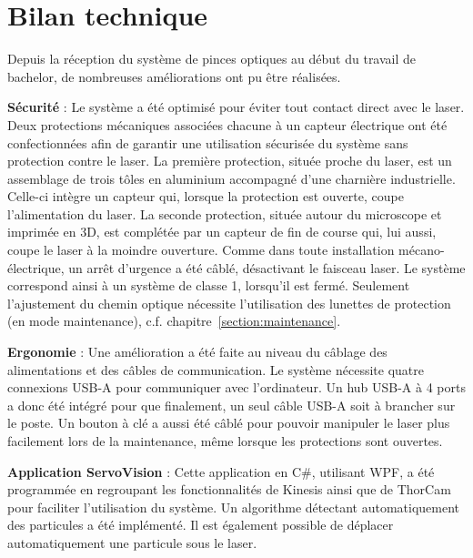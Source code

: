 

\section*{Bilan technique}
Depuis la réception du système de pinces optiques au début du travail de bachelor, de nombreuses améliorations ont pu être réalisées.

\textbf{Sécurité} :
Le système a été optimisé pour éviter tout contact direct avec le laser. Deux protections mécaniques associées chacune à un capteur électrique ont été confectionnées afin de garantir une utilisation sécurisée du système sans protection contre le laser. La première protection, située proche du laser, est un assemblage de trois tôles en aluminium accompagné d'une charnière industrielle. Celle-ci intègre un capteur qui, lorsque la protection est ouverte, coupe l'alimentation du laser. La seconde protection, située autour du microscope et imprimée en 3D, est complétée par un capteur de fin de course qui, lui aussi, coupe le laser à la moindre ouverture. Comme dans toute installation mécano-électrique, un arrêt d'urgence a été câblé, désactivant le faisceau laser. Le système correspond ainsi à un système de classe 1, lorsqu'il est fermé. Seulement l'ajustement du chemin optique nécessite l'utilisation des lunettes de protection (en mode maintenance), c.f. chapitre~\ref{section:maintenance}.

\textbf{Ergonomie} :
Une amélioration a été faite au niveau du câblage des alimentations et des câbles de communication. Le système nécessite quatre connexions USB-A pour communiquer avec l'ordinateur. Un hub USB-A à 4 ports a donc été intégré pour que finalement, un seul câble USB-A soit à brancher sur le poste. Un bouton à clé a aussi été câblé pour pouvoir manipuler le laser plus facilement lors de la maintenance, même lorsque les protections sont ouvertes.

\textbf{Application ServoVision} :
Cette application en C\#, utilisant WPF, a été programmée en regroupant les fonctionnalités de Kinesis ainsi que de ThorCam pour faciliter l'utilisation du système. Un algorithme détectant automatiquement des particules a été implémenté. Il est également possible de déplacer automatiquement une particule sous le laser.

